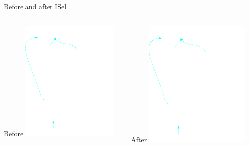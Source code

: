 
\begin{frame}{Before and after ISel}

\begin{columns}[t]
    \begin{block}{Before}
        \includegraphics[width = 0.75\textwidth]{examples/ex1-entry-selection-dag.png}
    \end{block}
    \begin{block}{After}
        \includegraphics[width = 0.8\textwidth]{examples/ex1-entry-machine-dag.png}
    \end{block}
\end{columns}

\end{frame}

